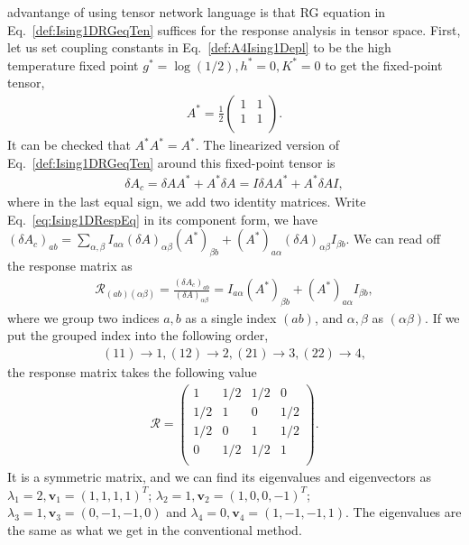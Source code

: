 \documentclass[aps,prb,reprint,superscriptaddress]{revtex4-2}
\begin{document}
advantange of using tensor network language is that RG equation in
Eq.~\eqref{def:Ising1DRGeqTen} suffices for the response analysis in
tensor space. First, let us set coupling constants in
Eq.~\eqref{def:A4Ising1Depl} to be the high temperature fixed point
$g^* = \log{\left(1/2\right)}, h^*=0, K^* = 0$ to get the fixed-point
tensor,
%
\begin{align}\label{eq:fixedA4Ising1D}
    A^* = \frac{1}{2}
\begin{pmatrix}
    1 & 1 \\
    1 & 1 \\
\end{pmatrix}.
\end{align}
%
It can be checked that $A^* A^* = A^*$. The linearized version of
Eq.~\eqref{def:Ising1DRGeqTen} around this fixed-point tensor is
%
\begin{align}\label{eq:Ising1DRespEq}
    \delta A_c = \delta A A^* + A^* \delta A = I \delta A A^* + A^*
    \delta A I,
\end{align}
%
where in the last equal sign, we add two identity matrices. Write
Eq.~\eqref{eq:Ising1DRespEq} in its component form, we have
$\left(\delta A_c\right)_{ab} =
\sum_{\alpha,\beta}I_{a\alpha}\left(\delta A\right)_{\alpha\beta}
\left(A^*\right)_{\beta b} + \left(A^*\right)_{a\alpha} \left(\delta
A\right)_{\alpha \beta} I_{\beta b}$. We can read off the response
matrix as
%
\begin{align}\label{eq:Ising1DRespMat}
    \mathcal{R}_{(ab)(\alpha \beta)} = \frac{\left(\delta
    A_c\right)_{ab}}{\left(\delta A\right)_{\alpha \beta}} =
    I_{a\alpha}\left(A^*\right)_{\beta b} + \left(A^*\right)_{a\alpha}
    I_{\beta b},
\end{align}
%
where we group two indices $a,b$ as a single index $(ab)$, and
$\alpha,\beta$ as $(\alpha\beta)$. If we put the grouped index into the
following order,
%
\begin{align}\label{def:orderConvention}
    (11) \rightarrow 1, (12) \rightarrow 2, (21) \rightarrow 3, (22)
    \rightarrow 4,
\end{align}
%
the response matrix takes the following value
%
\begin{align}\label{eq:Ising1DRespMatNum}
    \mathcal{R} = 
\begin{pmatrix}
    1 & 1/2 & 1/2 & 0 \\
    1/2 & 1 & 0 & 1/2 \\
    1/2 & 0 & 1 & 1/2 \\
    0 & 1/2 & 1/2 & 1 \\
\end{pmatrix}.
\end{align}
%
It is a symmetric matrix, and we can find its eigenvalues and
eigenvectors as $\lambda_1 = 2,\mathbf{v}_1 = (1,1,1,1)^T$; $\lambda_2 =
1,\mathbf{v}_2 = (1,0,0,-1)^T$; $\lambda_3 =1, \mathbf{v}_3 =
(0,-1,-1,0)$ and $\lambda_4 = 0, \mathbf{v}_4 = (1,-1,-1,1)$. The
eigenvalues are the same as what we get in the conventional method. 
%
\end{document}
